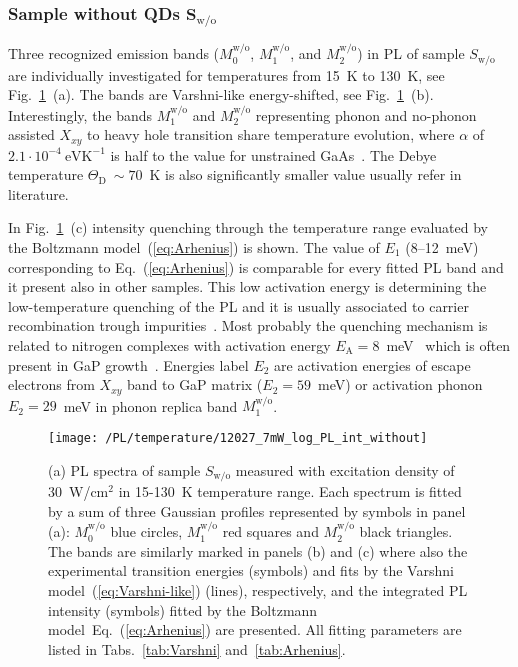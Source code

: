 \subsubsection*{Sample without QDs $\mathbf{S_\mathrm{w/o}}$}
%
Three recognized emission bands ($M_0^\mathrm{w/o}$, $M_1^\mathrm{w/o}$, and $M_2^\mathrm{w/o}$) in PL of sample ${S_\mathrm{w/o}}$ are individually investigated for temperatures from 15~K to 130~K, see Fig.~\ref{fig:QD_wo_temp}~(a). The bands are  Varshni-like energy-shifted,
see Fig.~\ref{fig:QD_wo_temp}~(b). Interestingly, the bands $M_1^\mathrm{w/o}$ and $M_2^\mathrm{w/o}$ representing phonon and no-phonon assisted $X_{xy}$ to heavy hole transition share temperature evolution, where $\alpha$ of $2.1\cdot10^{-4}~\mathrm{eVK^{-1}}$ is half to the value for unstrained GaAs~\cite{ioffe, Vurgaftman}. The Debye temperature $\Theta_\mathrm{D}~\sim70$~K is also significantly smaller value usually refer in literature.

In Fig.~\ref{fig:QD_wo_temp}~(c) intensity quenching through the temperature range evaluated by the Boltzmann model~(\ref{eq:Arhenius}) is shown. The value of $E_1$ (8--12~meV) corresponding to Eq.~(\ref{eq:Arhenius}) is comparable for every fitted PL band and it present also in other samples. This low activation energy is determining the low-temperature quenching of the PL and it is usually associated to carrier recombination trough impurities~\cite{YuCardona}. Most probably the quenching mechanism is related to nitrogen complexes with activation energy $E_\mathrm{A}=8$~meV~\cite{ioffe} which is often present in GaP growth~\cite{Skazochkin_GaPtraps}. Energies label $E_2$ are activation energies of escape electrons from $X_{xy}$ band to GaP matrix ($E_2=59$~meV) or activation phonon $E_2=29$~meV in phonon replica band $M_1^\mathrm{w/o}$. 
%
\begin{figure}
	\centering
	\texttt{[image: /PL/temperature/12027\_7mW\_log\_PL\_int\_without]}
	\caption{(a) PL spectra of sample $S_\mathrm{w/o}$ measured with excitation density of 30~W/cm$^2$ in 15-130~K temperature range. Each spectrum is fitted by a sum of three Gaussian profiles represented by symbols in panel (a): $M_0^\mathrm{w/o}$ blue circles, $M_1^\mathrm{w/o}$ red squares and $M_2^\mathrm{w/o}$ black triangles. The bands are similarly marked in panels (b) and (c) where also the experimental transition energies (symbols) and fits by the Varshni model~(\ref{eq:Varshni-like}) (lines), respectively, and the integrated PL intensity (symbols) fitted by the Boltzmann model~Eq.~(\ref{eq:Arhenius}) are presented. All fitting parameters are listed in Tabs.~\ref{tab:Varshni} and~\ref{tab:Arhenius}.}
	\label{fig:QD_wo_temp}
\end{figure}


